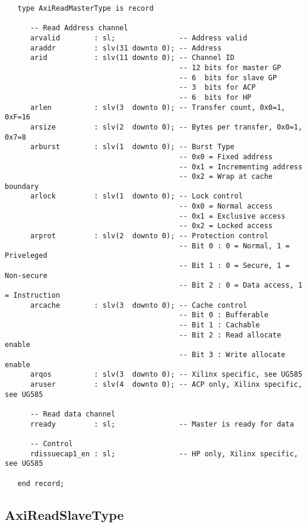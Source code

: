 \documentclass[11pt]{article}
\begin{document}
\small 
\begin{verbatim}
   type AxiReadMasterType is record

      -- Read Address channel
      arvalid        : sl;               -- Address valid
      araddr         : slv(31 downto 0); -- Address
      arid           : slv(11 downto 0); -- Channel ID
                                         -- 12 bits for master GP
                                         -- 6  bits for slave GP
                                         -- 3  bits for ACP
                                         -- 6  bits for HP
      arlen          : slv(3  downto 0); -- Transfer count, 0x0=1, 0xF=16
      arsize         : slv(2  downto 0); -- Bytes per transfer, 0x0=1, 0x7=8
      arburst        : slv(1  downto 0); -- Burst Type
                                         -- 0x0 = Fixed address
                                         -- 0x1 = Incrementing address
                                         -- 0x2 = Wrap at cache boundary
      arlock         : slv(1  downto 0); -- Lock control
                                         -- 0x0 = Normal access
                                         -- 0x1 = Exclusive access
                                         -- 0x2 = Locked access
      arprot         : slv(2  downto 0); -- Protection control
                                         -- Bit 0 : 0 = Normal, 1 = Priveleged
                                         -- Bit 1 : 0 = Secure, 1 = Non-secure
                                         -- Bit 2 : 0 = Data access, 1 = Instruction
      arcache        : slv(3  downto 0); -- Cache control
                                         -- Bit 0 : Bufferable
                                         -- Bit 1 : Cachable  
                                         -- Bit 2 : Read allocate enable
                                         -- Bit 3 : Write allocate enable
      arqos          : slv(3  downto 0); -- Xilinx specific, see UG585
      aruser         : slv(4  downto 0); -- ACP only, Xilinx specific, see UG585

      -- Read data channel
      rready         : sl;               -- Master is ready for data

      -- Control 
      rdissuecap1_en : sl;               -- HP only, Xilinx specific, see UG585  

   end record;
\end{verbatim}
\normalsize

\subsection{AxiReadSlaveType}
\label{subsec:AxiReadSlaveType}
\end{document}
